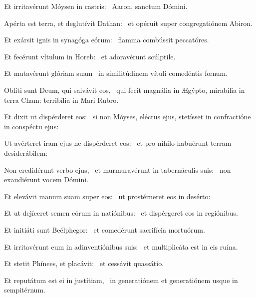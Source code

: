 \item Et irritavérunt Móysen in castris:~\psstar{} Aaron, sanctum Dómini.

\item Apérta est terra, et deglutívit Dathan:~\psstar{} et opéruit super congregatiónem Abiron.

\item Et exársit ignis in synagóga eórum:~\psstar{} flamma combússit peccatóres.

\item Et fecérunt vítulum in Horeb:~\psstar{} et adoravérunt scúlptile.

\item Et mutavérunt glóriam suam~\psstar{} in similitúdinem vítuli comedéntis fœnum.

\item Oblíti sunt Deum, qui salvávit eos,~\psstar{} qui fecit magnália in Ægýpto, mirabília in terra Cham: terribília in Mari Rubro.

\item Et dixit ut dispérderet eos:~\psstar{} si non Móyses, eléctus ejus, stetísset in confractióne in conspéctu ejus:

\item Ut avérteret iram ejus ne dispérderet eos:~\psstar{} et pro níhilo habuérunt terram desiderábilem:

\item Non credidérunt verbo ejus,~\pscross{} et murmuravérunt in tabernáculis suis:~\psstar{} non exaudiérunt vocem Dómini.

\item Et elevávit manum suam super eos:~\psstar{} ut prostérneret eos in desérto:

\item Et ut dejíceret semen eórum in natiónibus:~\psstar{} et dispérgeret eos in regiónibus.

\item Et initiáti sunt Beélphegor:~\psstar{} et comedérunt sacrifícia mortuórum.

\item Et irritavérunt eum in adinventiónibus suis:~\psstar{} et multiplicáta est in eis ruína.

\item Et stetit Phínees, et placávit:~\psstar{} et cessávit quassátio.

\item Et reputátum est ei in justítiam,~\psstar{} in generatiónem et generatiónem usque in sempitérnum.

